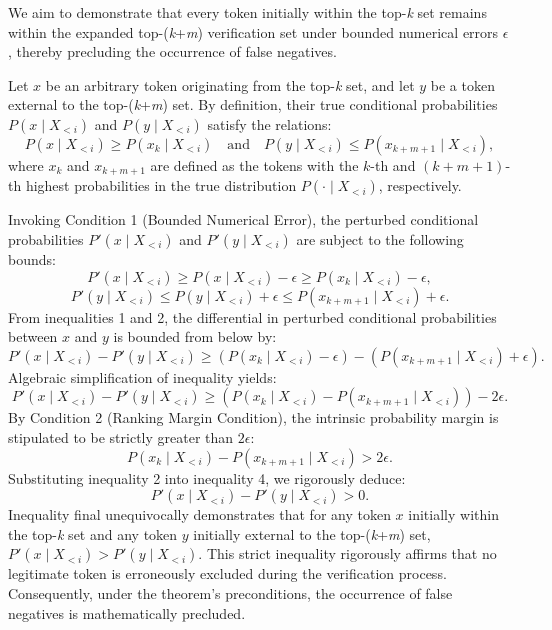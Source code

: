 \documentclass{article}
\begin{document}
We aim to demonstrate that every token initially within the top-\textit{k} set remains within the expanded top-(\textit{k}+\textit{m}) verification set under bounded numerical errors \(\epsilon\), thereby precluding the occurrence of false negatives.

Let \(x\) be an arbitrary token originating from the top-\textit{k} set, and let \(y\) be a token external to the top-(\textit{k}+\textit{m}) set. By definition, their true conditional probabilities \(P(x \mid X_{<i})\) and \(P(y \mid X_{<i})\) satisfy the relations:
\[
P(x \mid X_{<i}) \geq P(x_{k} \mid X_{<i}) \quad \text{and} \quad P(y \mid X_{<i}) \leq P(x_{k+m+1} \mid X_{<i}),
\]
where \(x_{k}\) and \(x_{k+m+1}\) are defined as the tokens with the \(k\)-th and \((k+m+1)\)-th highest probabilities in the true distribution \(P(\cdot \mid X_{<i})\), respectively.

Invoking Condition 1 (Bounded Numerical Error), the perturbed conditional probabilities \(P'(x \mid X_{<i})\) and \(P'(y \mid X_{<i})\) are subject to the following bounds:
\[
P'(x \mid X_{<i}) \geq P(x \mid X_{<i}) - \epsilon \geq P(x_{k} \mid X_{<i}) - \epsilon,
\]
\[
P'(y \mid X_{<i}) \leq P(y \mid X_{<i}) + \epsilon \leq P(x_{k+m+1} \mid X_{<i}) + \epsilon.
\]
From inequalities 1 and 2, the differential in perturbed conditional probabilities between \(x\) and \(y\) is bounded from below by:
\[
P'(x \mid X_{<i}) - P'(y \mid X_{<i}) \geq \left(P(x_{k} \mid X_{<i}) - \epsilon\right) - \left(P(x_{k+m+1} \mid X_{<i}) + \epsilon\right).
\]
Algebraic simplification of inequality yields:
\[
P'(x \mid X_{<i}) - P'(y \mid X_{<i}) \geq \left(P(x_{k} \mid X_{<i}) - P(x_{k+m+1} \mid X_{<i})\right) - 2\epsilon.
\]
By Condition 2 (Ranking Margin Condition), the intrinsic probability margin is stipulated to be strictly greater than \(2\epsilon\):
\[
P(x_{k} \mid X_{<i}) - P(x_{k+m+1} \mid X_{<i}) > 2\epsilon.
\]
Substituting inequality 2 into inequality 4, we rigorously deduce:
\[
P'(x \mid X_{<i}) - P'(y \mid X_{<i}) > 0.
\]
Inequality final unequivocally demonstrates that for any token \(x\) initially within the top-\textit{k} set and any token \(y\) initially external to the top-(\textit{k}+\textit{m}) set, \(P'(x \mid X_{<i}) > P'(y \mid X_{<i})\). This strict inequality rigorously affirms that no legitimate token is erroneously excluded during the verification process. Consequently, under the theorem's preconditions, the occurrence of false negatives is mathematically precluded.
\end{document}
